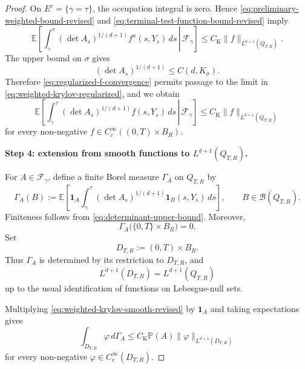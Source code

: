 \documentclass[10pt,a4paper]{amsart}
\begin{document}
\begin{proof}
	On \(E^c=\{\gamma=\tau\}\), the occupation integral is zero.
	Hence \eqref{eq:preliminary-weighted-bound-revised} and
	\eqref{eq:terminal-test-function-bound-revised} imply
	\begin{equation}
		\label{eq:weighted-krylov-regularized}
		\mathbb E\left[
		\left.
		\int_\gamma^\tau
		(\det A_s)^{1/(d+1)}
		f^n(s,Y_s)\,ds
		\,\right|\,
		\mathcal F_\gamma
		\right]
		\leq
		C_{\mathrm K}
		\|f\|_{L^{d+1}(Q_{T,R})}.
	\end{equation}
	The upper bound on \(\sigma\) gives
	\begin{equation}
		\label{eq:determinant-upper-bound}
		(\det A_s)^{1/(d+1)}
		\leq
		C(d,K_\sigma).
	\end{equation}
	Therefore \eqref{eq:regularized-f-convergence} permits passage to the
	limit in \eqref{eq:weighted-krylov-regularized}, and we obtain
	\begin{equation}
		\label{eq:weighted-krylov-smooth-revised}
		\mathbb E\left[
		\left.
		\int_\gamma^\tau
		(\det A_s)^{1/(d+1)}
		f(s,Y_s)\,ds
		\,\right|\,
		\mathcal F_\gamma
		\right]
		\leq
		C_{\mathrm K}
		\|f\|_{L^{d+1}(Q_{T,R})}
	\end{equation}
	for every non-negative
	\(f\in C_c^\infty((0,T)\times B_R)\).
	
	
	\textbf{Step 4: extension from smooth functions to	\(L^{d+1}(Q_{T,R})\).}
	
	For \(A\in\mathcal F_\gamma\), define a finite Borel measure	\(\Gamma_A\) on \(Q_{T,R}\) by
	\begin{equation}
		\label{eq:conditional-occupation-measure}
		\Gamma_A(B)	:=
		\mathbb E\left[
		\mathbf1_A
		\int_\gamma^\tau
		(\det A_s)^{1/(d+1)}
		\mathbf1_B(s,Y_s)\,ds
		\right],
		\qquad
		B\in\mathcal B(Q_{T,R}).
	\end{equation}
	Finiteness follows from
	\eqref{eq:determinant-upper-bound}. Moreover,
	\[
	\Gamma_A\bigl(\{0,T\}\times B_R\bigr)=0.
	\]
	Set
	\[
	D_{T,R}:=(0,T)\times B_R.
	\]
	Thus \(\Gamma_A\) is determined by its restriction to \(D_{T,R}\),
	and
	\[
	L^{d+1}(D_{T,R})
	=
	L^{d+1}(Q_{T,R})
	\]
	up to the usual identification of functions on Lebesgue-null sets.
	
	Multiplying \eqref{eq:weighted-krylov-smooth-revised} by
	\(\mathbf1_A\) and taking expectations gives
	\begin{equation}
		\label{eq:occupation-measure-smooth-bound}
		\int_{D_{T,R}}\varphi\,d\Gamma_A
		\leq
		C_{\mathrm K}\mathbb P(A)
		\|\varphi\|_{L^{d+1}(D_{T,R})}
	\end{equation}
	for every non-negative
	\(\varphi\in C_c^\infty(D_{T,R})\).
	

\end{proof}
\end{document}

